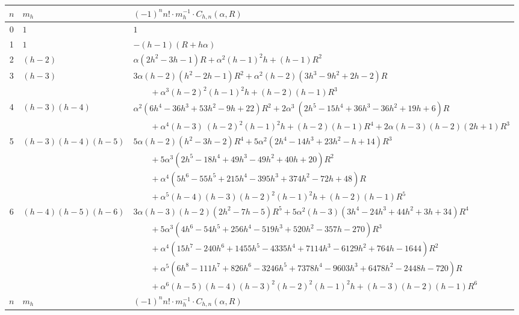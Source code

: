 \documentclass[12pt,reqno]{article}
\numberwithin{sfootnote}{section}
\newcommand{\tabletopstrut}[0]{\rule{0pt}{3ex}}
\numberwithin{equation}{section}
\theoremstyle{DefaultTheoremStyle}
\theoremstyle{definition}
\begin{document}
\begin{table}[h]
\begin{subtable}{\textwidth}
\begin{tabular}{|c|l|l|} \hline 
\hline\tabletopstrut 
$n$ & $m_{h}$ & $(-1)^{n} n! \cdot m_h^{-1} \cdot C_{h,n}(\alpha, R)$ \\ \hline 
0 & $1$ & $1$ \\ 
1 & $1$ & $-(h-1) (R+ h\alpha)$ \\ 
2 & $(h-2)$ & 
    $\alpha  \left(2 h^2-3 h-1\right) R+\alpha ^2 (h-1)^2 h+(h-1) R^2$ \\ 
3 & $(h-3)$ & 
    $3 \alpha  (h-2) \left(h^2-2 h-1\right) R^2+ 
     \alpha ^2 (h-2) \left(3 h^3-9 h^2+2 h-2\right) R$ \\ 
  & & 
    $\qquad + 
     \alpha ^3 (h-2)^2 (h-1)^2 h+(h-2) (h-1) R^3$ \\ 
4 & $(h-3)(h-4)$ & 
    $\alpha ^2 \left(6 h^4-36 h^3+53 h^2-9 h+22\right) R^2+2 \alpha ^3 \
     \left(2 h^5-15 h^4+36 h^3-36 h^2+19 h+6\right) R$ \\ 
  & & 
    $\qquad + 
     \alpha ^4 (h-3) \
     (h-2)^2 (h-1)^2 h+(h-2) (h-1) R^4+2 \alpha  (h-3) (h-2) (2 h+1) R^3$ \\ 
5 & $(h-3)(h-4)(h-5)$ & 
    $5 \alpha  (h-2) \left(h^2-3 h-2\right) R^4+5 \alpha ^2 \left(2 h^4-14 h^3+23 h^2-h+14\right) R^3$ \\ 
  & & 
    $\qquad + 
     5 \alpha ^3 \left(2 h^5-18 h^4+49 h^3-49 h^2+40 h+20\right) R^2$ \\ 
  & & 
    $\qquad + 
     \alpha ^4 \left(5 h^6-55 h^5+215 h^4-395 h^3+374 h^2-72 h+48\right) R$ \\ 
  & & 
    $\qquad + 
     \alpha ^5 (h-4) (h-3) (h-2)^2 (h-1)^2 h+(h-2) (h-1) R^5$ \\ 
6 & $(h-4)(h-5)(h-6)$ & 
    $3 \alpha  (h-3) (h-2) \left(2 h^2-7 h-5\right) R^5+5 \alpha ^2 (h-3) \left(3 h^4-24 h^3+44 h^2+3 h+34\right) R^4$ \\ 
  & & 
    $\qquad + 
     5 \alpha ^3 \left(4 h^6-54 h^5+256 h^4-519 h^3+520 h^2-357 h-270\right) R^3$ \\ 
  & & 
    $\qquad + 
     \alpha ^4 \left(15 h^7-240 h^6+1455 h^5-4335 h^4+7114 h^3-6129 h^2+764 h-1644\right) R^2$ \\ 
  & & 
    $\qquad + 
     \alpha ^5 \left(6 h^8-111 h^7+826 h^6-3246 h^5+7378 h^4-9603 h^3+6478 h^2-2448 h-720\right) R$ \\ 
  & & 
    $\qquad + 
     \alpha ^6 (h-5) (h-4) (h-3)^2 (h-2)^2 (h-1)^2 h+(h-3) (h-2) (h-1) R^6$ \\ \hline 
\hline\tabletopstrut 
$n$ & $m_{h}$ & $(-1)^{n} n! \cdot m_h^{-1} \cdot C_{h,n}(\alpha, R)$ \\ \hline 

\end{tabular}
\end{subtable}
\end{table}
\end{document}
